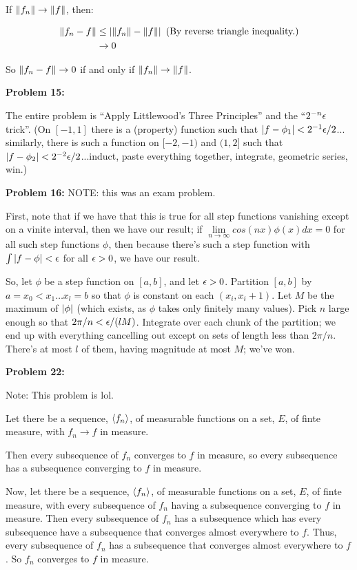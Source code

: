 \documentclass[a4paper,12pt]{article}
\begin{document}
If $\|f_n\| \to \|f\|$, then: 

\begin{align*}
\|f_n - f\| &\leq \left\lvert \|f_n\| - \|f\| \right\rvert \text{ (By reverse triangle inequality.)} \\
&\to 0
\end{align*} 

So $\|f_n - f\| \to 0$ if and only if $\|f_n\| \to \|f\|$.

\shunt

{\bf Problem 15:}

The entire problem is ``Apply Littlewood's Three Principles'' and the ``$2^{-n}\epsilon$ trick''. (On $[-1,1]$ there is a (property) function such that $\left\lvert f-\phi_1 \right\rvert < 2^{-1}\epsilon/2$... similarly, there is such a function on $[-2,-1)$ and $(1,2]$ such that $\left\lvert f-\phi_2 \right\rvert < 2^{-2}\epsilon/2$...induct, paste everything together, integrate, geometric series, win.)

\shunt

{\bf Problem 16:} NOTE: this was an exam problem.

First, note that if we have that this is true for all step functions vanishing except on a vinite interval, then we have our result; if $\lim\limits_{n \to \infty} cos(nx)\phi(x) dx = 0$ for all such step functions $\phi$, then because there's such a step function with $\int\left\lvert f - \phi \right\rvert < \epsilon$ for all $\epsilon>0$, we have our result.

So, let $\phi$ be a step function on $[a,b]$, and let $\epsilon>0$. Partition $[a,b]$ by $a = x_0 < x_1 \ldots x_l = b$ so that $\phi$ is constant on each $(x_i,x_i+1)$. Let $M$ be the maximum of $\left\lvert \phi \right\rvert$ (which exists, as $\phi$ takes only finitely many values). Pick $n$ large enough so that $2\pi / n < \epsilon /(lM)$. Integrate over each chunk of the partition; we end up with everything cancelling out except on sets of length less than $2\pi/n$. There's at most $l$ of them, having magnitude at most $M$; we've won.

\shunt

{\bf Problem 22:}

Note: This problem is lol.

Let there be a sequence, $\left\langle f_n \right\rangle$, of measurable functions on a set, $E$, of finte measure, with $f_n \to f$ in measure.

Then every subsequence of $f_n$ converges to $f$ in measure, so every subsequence has a subsequence converging to $f$ in measure.

Now, let there be a sequence, $\left\langle f_n \right\rangle$, of measurable functions on a set, $E$, of finte measure, with every subsequence of $f_n$ having a subsequence converging to $f$ in measure.  Then every subsequence of $f_n$ has a  subsequence which has every subsequence have a subsequence that converges almost everywhere to $f$. Thus, every subsequence of $f_n$ has a subsequence that converges almost everywhere to $f$. So $f_n$ converges to $f$ in measure.
\end{document}
